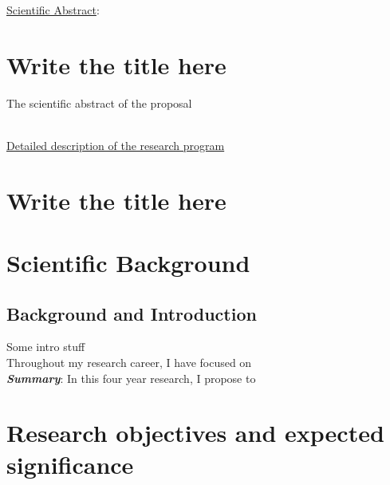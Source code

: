\documentclass[a4paper,11pt]{article}
\title{\thetitle}
\author{}
\date{}
\begin{document}
\onehalfspacing

\noindent\textsf{\underline{Scientific Abstract}:}

\section*{\centering Write the title here }

The scientific abstract of the proposal

\newpage


\onehalfspacing

\Large\textsf{\\\underline{Detailed description of the research program}\\}
\normalsize

\section*{\vspace{-5px}\centering\LARGE   Write the title here}

\section{Scientific Background}
\label{sec:scientific_background}

\subsection{Background and Introduction}\label{sec:stateofart:intro}

Some intro stuff
\\


Throughout my research career, I have focused on 
\\

\noindent\textit{\textbf{Summary}}: 
In this four year research, I propose to

\section{Research objectives and expected significance}
\label{sec:objectives}
\end{document}
